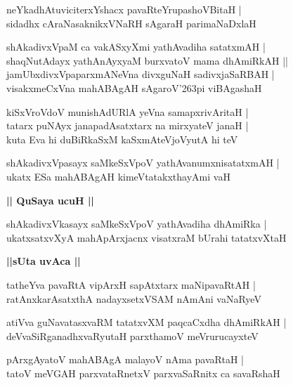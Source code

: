 \documentclass[twoside,12pt,openright]{book}
\def\S{\char'263}
\newcounter{shloka}[chapter]
\def\uvaca#1{\centerline{{\large\textbf{#1}}}}
\begin{document}
\begin{shloka}
neYkadhAtuviciterxYshacx pavaRteYrupashoVBitaH |\\
sidadhx cAraNasaknikxVNaRH sAgaraH parimaNaDxlaH
\end{shloka}

\begin{shloka}
shAkadivxVpaM ca vakASxyXmi yathAvadiha satatxmAH |\\
shaqNutAdayx yathAnAyxyaM burxvatoV mama dhAmiRkAH ||\\
jamUbxdivxVpaparxmANeVna divxguNaH sadivxjaSaRBAH |\\
visakxmeCxVna mahABAgAH sAgaroV\S pi viBAgashaH
\end{shloka}

\begin{shloka}
kiSxVroVdoV munishAdURlA yeVna samapxrivAritaH |\\
tatarx puNAyx janapadAsatxtarx na mirxyateV janaH |\\
kuta Eva hi duBiRkaSxM kaSxmAteVjoVyutA hi teV 
\end{shloka}

\begin{shloka}
shAkadivxVpasayx saMkeSxVpoV yathAvanumxnisatatxmAH |\\
ukatx ESa mahABAgAH kimeVtatakxthayAmi vaH 
\end{shloka}


\uvaca {|| QuSaya ucuH ||}

\begin{shloka}
shAkadivxVkasayx saMkeSxVpoV yathAvadiha dhAmiRka |\\
ukatxsatxvXyA mahApArxjacnx visatxraM bUrahi tatatxvXtaH 
\end{shloka}

\uvaca{||sUta uvAca ||}

\begin{shloka}
tatheYva pavaRtA vipArxH sapAtxtarx maNipavaRtAH |\\
ratAnxkarAsatxthA nadayxsetxVSAM nAmAni vaNaRyeV 
\end{shloka}

\begin{shloka}
atiVva guNavatasxvaRM tatatxvXM paqcaCxdha dhAmiRkAH |\\
deVvaSiRganadhxvaRyutaH parxthamoV meVrurucayxteV
\end{shloka}

\begin{shloka}
pArxgAyatoV mahABAgA malayoV nAma pavaRtaH |\\
tatoV meVGAH parxvataRnetxV parxvaSaRnitx ca savaRshaH
\end{shloka}
\end{document}
